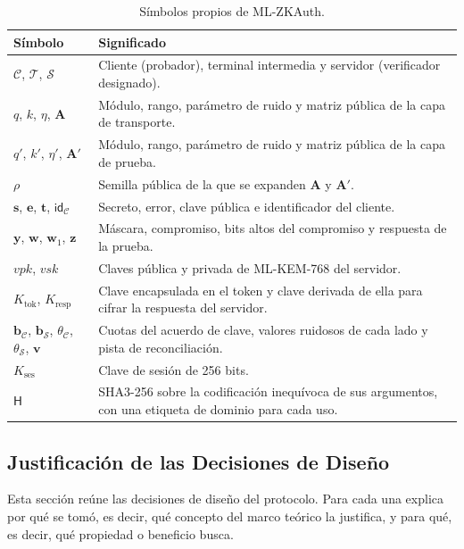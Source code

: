 \begin{table}[H]
\centering
\caption{Símbolos propios de ML-ZKAuth.}
\label{tab:pqlite_notacion}
\small
\begin{tabularx}{\textwidth}{lY}
\toprule
\textbf{Símbolo} & \textbf{Significado} \\
\midrule
$\mathcal{C}$, $\mathcal{T}$, $\mathcal{S}$ & Cliente (probador), terminal intermedia y servidor (verificador designado). \\
$q$, $k$, $\eta$, $\mathbf{A}$ & Módulo, rango, parámetro de ruido y matriz pública de la capa de transporte. \\
$q'$, $k'$, $\eta'$, $\mathbf{A}'$ & Módulo, rango, parámetro de ruido y matriz pública de la capa de prueba. \\
$\rho$ & Semilla pública de la que se expanden $\mathbf{A}$ y $\mathbf{A}'$. \\
$\mathbf{s}$, $\mathbf{e}$, $\mathbf{t}$, $\mathsf{id}_{\mathcal{C}}$ & Secreto, error, clave pública e identificador del cliente. \\
$\mathbf{y}$, $\mathbf{w}$, $\mathbf{w}_1$, $\mathbf{z}$ & Máscara, compromiso, bits altos del compromiso y respuesta de la prueba. \\
$vpk$, $vsk$ & Claves pública y privada de ML-KEM-768 del servidor. \\
$K_{\text{tok}}$, $K_{\text{resp}}$ & Clave encapsulada en el token y clave derivada de ella para cifrar la respuesta del servidor. \\
$\mathbf{b}_{\mathcal{C}}$, $\mathbf{b}_{\mathcal{S}}$, $\theta_{\mathcal{C}}$, $\theta_{\mathcal{S}}$, $\mathbf{v}$ & Cuotas del acuerdo de clave, valores ruidosos de cada lado y pista de reconciliación. \\
$K_{\text{ses}}$ & Clave de sesión de 256 bits. \\
$\mathsf{H}$ & SHA3-256 sobre la codificación inequívoca de sus argumentos, con una etiqueta de dominio para cada uso. \\
\bottomrule
\end{tabularx}
\end{table}

\subsection{Justificación de las Decisiones de Diseño}
\label{sec:pqlite-diseno}

Esta sección reúne las decisiones de diseño del protocolo. Para cada una explica por qué se tomó, es decir, qué concepto del marco teórico la justifica, y para qué, es decir, qué propiedad o beneficio busca.

